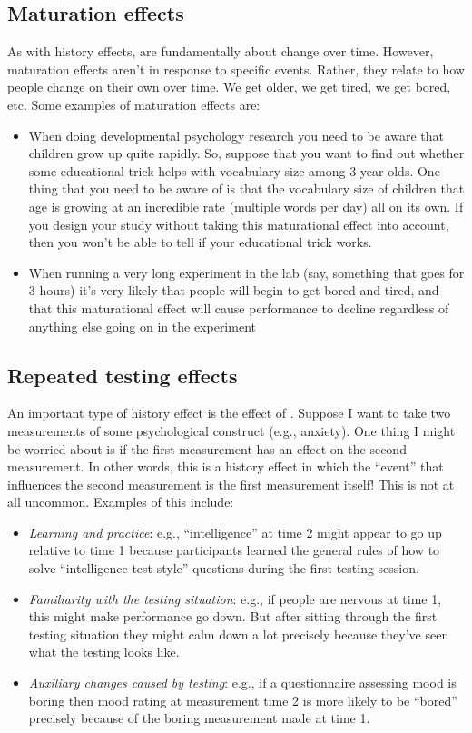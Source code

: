 \subsection{Maturation effects}

As with history effects,  are fundamentally about change over time. However, maturation effects aren't in response to specific events. Rather, they relate to how people change on their own over time. We get older, we get tired, we get bored, etc. Some examples of maturation effects are:

\begin{itemize}
\item When doing developmental psychology research you need to be aware that children grow up quite rapidly. So, suppose that you want to find out whether some educational trick helps with vocabulary size among 3 year olds. One thing that you need to be aware of is that the vocabulary size of children that age is growing at an incredible rate (multiple words per day) all on its own. If you design your study without taking this maturational effect into account, then you won't be able to tell if your educational trick works.
\item When running a very long experiment in the lab (say, something that goes for 3 hours) it's very likely that people will begin to get bored and tired, and that this maturational effect will cause performance to decline regardless of anything else going on in the experiment
\end{itemize}

\subsection{Repeated testing effects}

An important type of history effect is the effect of . Suppose I want to take two measurements of some psychological construct (e.g., anxiety). One thing I might be worried about is if the first measurement has an effect on the second measurement. In other words, this is a history effect in which the ``event'' that influences the second measurement is the first measurement itself! This is not at all uncommon. Examples of this include:

\begin{itemize}
\item {\it Learning and practice}: e.g., ``intelligence'' at time 2 might appear to go up relative to time 1 because participants learned the general rules of how to solve ``intelligence-test-style'' questions during the first testing session.  
\item {\it Familiarity with the testing situation}: e.g., if people are nervous at time 1, this might make performance go down. But after sitting through the first testing situation they might calm down a lot precisely because they've seen what the testing looks like. 
\item {\it Auxiliary changes caused by testing}: e.g., if a questionnaire assessing mood is boring then mood rating at measurement time 2 is more likely to be ``bored'' precisely because of the boring measurement made at time 1. 
\end{itemize}

